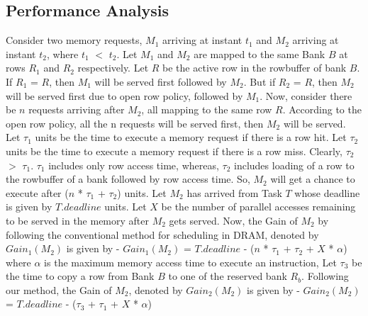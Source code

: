 \subsection{Performance Analysis}\label{opom}
\noindent
Consider two memory requests, $M_{1}$ arriving at instant $t_{1}$ and $M_{2}$ arriving at instant $t_{2}$, where $t_{1}$ $<$ 
$t_{2}$. Let $M_{1}$ and $M_{2}$ are mapped to the same Bank $B$ at rows $R_{1}$ and $R_{2}$ respectively. 
Let $R$ be the active row in the rowbuffer of bank $B$. If $R_{1}$ = $R$, then $M_{1}$ will be served first followed by 
$M_{2}$. But if $R_{2}$ = $R$, then $M_{2}$ will be served first due to open row policy, followed by $M_{1}$.
\newline
\newline
Now, consider there be $n$ requests arriving after $M_{2}$, all mapping to the same row $R$. According to the open row policy,
all the n requests will be served first, then $M_{2}$ will be served. Let $\tau_{1}$ units be the time to execute a memory 
request if there is a row hit. Let $\tau_{2}$ units be the time to execute a memory request if there is a row miss. Clearly, 
$\tau_{2}$ $>$ $\tau_{1}$. $\tau_{1}$ includes only row access time, whereas, $\tau_{2}$ includes loading of a row to the 
rowbuffer of a bank followed by row access time. So, $M_{2}$ will get a chance to execute after ($n$ * $\tau_{1}$ + $\tau_{2}$)
units. Let $M_{2}$ has arrived from Task $T$ whose deadline is given by $T.deadline$ units. Let $X$ be the number of parallel 
accesses remaining to be served in the memory after $M_{2}$ gets served. Now, the Gain of $M_{2}$ by following the 
conventional method for scheduling in DRAM, denoted by 
$Gain_{1}(M_{2})$ is given by - 
\newline
\newline
$Gain_{1}(M_{2})$ = $T.deadline$ - ($n$ * $\tau_{1}$ + $\tau_{2}$ + $X$ * $\alpha$)
\newline
\newline
where $\alpha$ is the maximum memory access time to execute an instruction,
\newline
\newline
Let $\tau_{3}$ be the time to copy a row from Bank $B$ to one of the reserved bank $R_{b}$. Following our method, the Gain of 
$M_{2}$, denoted by $Gain_{2}(M_{2})$ is given by -
\newline
\newline
$Gain_{2}(M_{2})$ = $T.deadline$ - ($\tau_{3}$ + $\tau_{1}$ + $X$ * $\alpha$)
\newline
\newline
